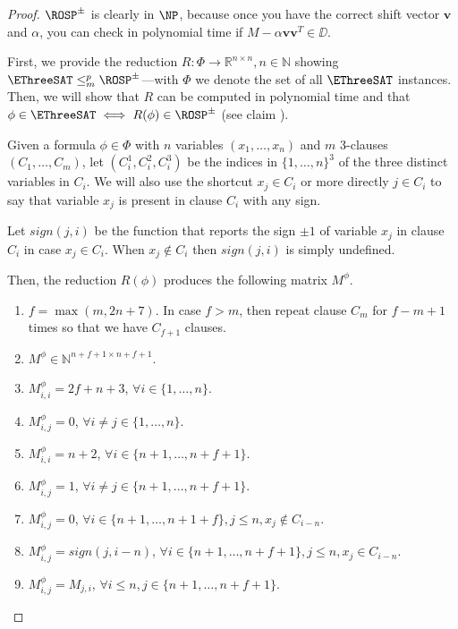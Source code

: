 \begin{proof}
	$\ROSP^{\pm}$ is clearly in $\NP$, because once you have the correct shift vector $\mathbf{v}$ and $\alpha$, you can check in polynomial time if $M-\alpha \mathbf{vv}^T \in \DD$.
	

	 First, we provide the reduction $R: \Phi \to \mathbb{R}^{n \times n}, n\in\mathbb{N}$ showing $ \EThreeSAT \leq_m^p \ROSP^{\pm}$---with $\Phi$ we denote the set of all $\EThreeSAT$ instances. Then, we will show that $R$ can be computed in polynomial time and that $\phi\in\EThreeSAT\iff R(\phi)\in\ROSP^{\pm}$ (see claim ).
	 
	 Given a formula $\phi\in\Phi$ with $n$ variables $(x_1, \dots, x_n)$ and $m$ 3-clauses $(C_1, \dots, C_m)$, let $(C_i^1, C_i^2, C_i^3)$ be the indices in $\{1, \dots, n\}^3$ of the three distinct variables in $C_i$. We will also use the shortcut $x_j \in C_i$ or more directly $j\in C_i$ to say that variable $x_j$ is present in clause $C_i$ with any sign.
	 
	 Let $sign(j,i)$ be the function that reports the sign $\pm 1$ of variable $x_j$ in clause $C_i$ in case $x_j\in C_i$. When $x_j\notin C_i$ then $sign(j,i)$ is simply undefined.
	 
	 Then, the reduction $R(\phi)$ produces the following matrix $M^\phi$.
	 
	 \begin{enumerate}
		\item $f = \max(m, 2n+7)$. In case $f>m$, then repeat clause $C_m$ for $f-m+1$ times so that we have $C_{f+1}$ clauses.
		\item $M^\phi\in\mathbb{N}^{n+f+1 \times n + f + 1}$.
		\item $M^\phi_{i,i} = 2f + n +3$, $\forall i \in \{1, \dots, n\}$.
		\item $M^\phi_{i,j} = 0$, $\forall i\neq j \in \{1, \dots, n\}$.
		\item $M^\phi_{i,i} = n+2$, $\forall i\in\{n+1, \dots, n+f+1\}$.
		\item $M^\phi_{i,j} = 1$, $\forall i\neq j \in\{n+1, \dots, n+f+1\}$.
		\item $M^\phi_{i,j} = 0$, $\forall i \in \{n+1, \dots, n+1+f\}, j \leq n, x_j \notin C_{i-n}$.
		\item $M^\phi_{i,j} = sign(j,i-n)$, $\forall i \in \{n+1, \dots, n+f+1\}, j\leq n, x_j \in C_{i-n}$. 
		\item $M^\phi_{i,j} = M_{j,i}$, $\forall i \leq n, j \in \{n+1, \dots, n+f+1\}$.
	\end{enumerate}
	 

\end{proof}
